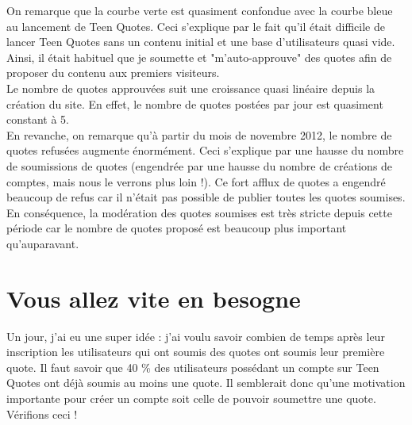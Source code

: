 \documentclass{report}
\begin{document}
	On remarque que la courbe verte est quasiment confondue avec la courbe bleue au lancement de Teen Quotes. Ceci s'explique par le fait qu'il était difficile de lancer Teen Quotes sans un contenu initial et une base d'utilisateurs quasi vide. Ainsi, il était habituel que je soumette et "m'auto-approuve" des quotes afin de proposer du contenu aux premiers visiteurs.\\

	Le nombre de quotes approuvées suit une croissance quasi linéaire depuis la création du site. En effet, le nombre de quotes postées par jour est quasiment constant à 5.\\

	En revanche, on remarque qu'à partir du mois de novembre 2012, le nombre de quotes refusées augmente énormément. Ceci s'explique par une hausse du nombre de soumissions de quotes (engendrée par une hausse du nombre de créations de comptes, mais nous le verrons plus loin !). Ce fort afflux de quotes a engendré beaucoup de refus car il n'était pas possible de publier toutes les quotes soumises. En conséquence, la modération des quotes soumises est très stricte depuis cette période car le nombre de quotes proposé est beaucoup plus important qu'auparavant.

	\section{Vous allez vite en besogne}
	Un jour, j'ai eu une super idée : j'ai voulu savoir combien de temps après leur inscription les utilisateurs qui ont soumis des quotes ont soumis leur première quote. Il faut savoir que 40 \% des utilisateurs possédant un compte sur Teen Quotes ont déjà soumis au moins une quote. Il semblerait donc qu'une motivation importante pour créer un compte soit celle de pouvoir soumettre une quote. Vérifions ceci !
\end{document}
